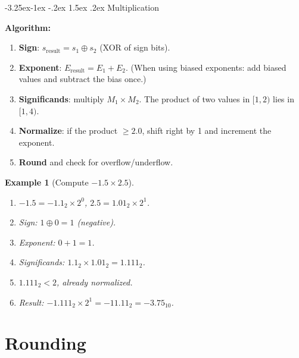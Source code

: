 \documentclass{article}
\makeatletter
\newtheorem{example}{Example}[section]
\theoremstyle{remark}
\newlength{\subsecindent}
\renewcommand\subsection{\@startsection{subsection}{2}{\subsecindent}%
  {-3.25ex\@plus -1ex \@minus -.2ex}%
  {1.5ex \@plus .2ex}%
  {\normalfont\large\bfseries}}
\newenvironment{sub}{%
  \begin{list}{}{%
    \setlength{\leftmargin}{4em}%
    \setlength{\rightmargin}{0pt}%
    \setlength{\topsep}{0pt}%
    \setlength{\partopsep}{0pt}%
    \setlength{\parsep}{\parskip}%
    \setlength{\itemsep}{\parskip}%
  }\item\relax
}{\end{list}}
\makeatother
\begin{document}
\subsection{Multiplication}
\begin{sub}
\textbf{Algorithm:}
\begin{enumerate}
  \item \textbf{Sign}: $s_{\text{result}} = s_1 \oplus s_2$ (XOR of sign bits).
  \item \textbf{Exponent}: $E_{\text{result}} = E_1 + E_2$.
        (When using biased exponents: add biased values and subtract the bias
        once.)
  \item \textbf{Significands}: multiply $M_1 \times M_2$.  The product of two
        values in $[1,2)$ lies in $[1,4)$.
  \item \textbf{Normalize}: if the product $\geq 2.0$, shift right by 1 and
        increment the exponent.
  \item \textbf{Round} and check for overflow/underflow.
\end{enumerate}

\begin{example}[Compute $-1.5 \times 2.5$]
\leavevmode
\begin{enumerate}
  \item $-1.5 = -1.1_2\times 2^0$, \quad $2.5 = 1.01_2\times 2^1$.
  \item Sign: $1 \oplus 0 = 1$ (negative).
  \item Exponent: $0 + 1 = 1$.
  \item Significands: $1.1_2 \times 1.01_2 = 1.111_2$.
  \item $1.111_2 < 2$, already normalized.
  \item Result: $-1.111_2 \times 2^{1} = -11.11_2 = -3.75_{10}$. \checkmark
\end{enumerate}
\end{example}
\end{sub}

\section{Rounding}
\end{document}
